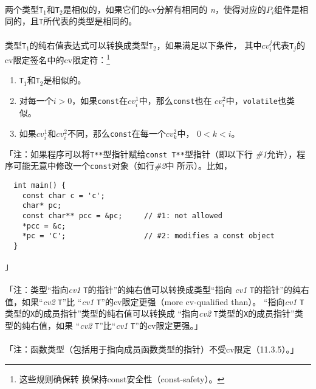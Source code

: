 \paragraph{}
两个类型\texttt{T$_1$}和\texttt{T$_2$}是相似的，如果它们的cv分解有相同的
\textit{n}，使得对应的$P_i$组件是相同的，且\texttt{T}所代表的类型是相同的。

\paragraph{}
类型\texttt{T$_1$}的纯右值表达式可以转换成类型\texttt{T$_2$}，如果满足以下条件，
其中$cv_i^j$代表\texttt{T$_j$}的cv限定签名中的cv限定符：\footnote{这些规则确保转
换保持const安全性（const-safety）。}
\begin{enumerate}
  \item{\texttt{T$_1$}和\texttt{T$_2$}是相似的。}
  \item{对每一个$i > 0$，如果\texttt{const}在$cv_i^1$中，那么\texttt{const}也在
    $cv_i^2$中，\texttt{volatile}也类似。}
  \item{如果$cv_i^1$和$cv_i^2$不同，那么\texttt{const}在每一个$cv_k^2$中，
    $0 < k < i$。}
\end{enumerate}
「注：如果程序可以将\texttt{T**}型指针赋给\texttt{const T**}型指针（即以下行
\textit{\#1}允许），程序可能无意中修改一个\texttt{const}对象（如行\textit{\#2}中
所示）。比如，
\begin{lstlisting}
  int main() {
    const char c = 'c';
    char* pc;
    const char** pcc = &pc;     // #1: not allowed
    *pcc = &c;
    *pc = 'C';                  // #2: modifies a const object
  }
\end{lstlisting}」

\paragraph{}
「注：类型``指向\textit{cv1} \texttt{T}的指针''的纯右值可以转换成类型``指向
\textit{cv1} \texttt{T}的指针''的纯右值，如果``\textit{cv2} \texttt{T}''比
``\textit{cv1} \texttt{T}''的cv限定更强（more cv-qualified than）。
``指向\textit{cv1} \texttt{T}类型的\texttt{X}的成员指针''类型的纯右值可以转换成
``指向\textit{cv2} \texttt{T}类型的\texttt{X}的成员指针''类型的纯右值，如果
``\textit{cv2} \texttt{T}''比``\textit{cv1} \texttt{T}''的cv限定更强。」

\paragraph{}
「注：函数类型（包括用于指向成员函数类型的指针）不受cv限定（11.3.5）。」

